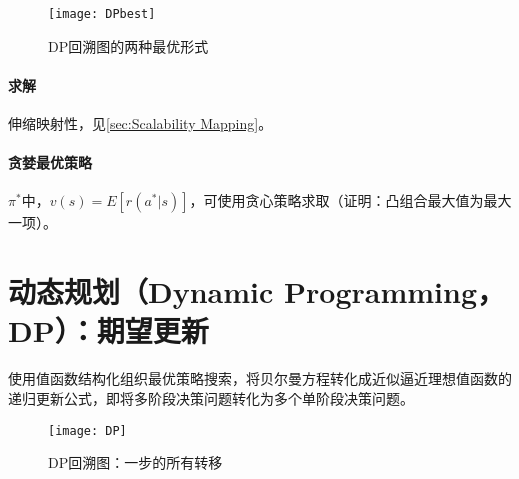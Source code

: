 \documentclass[
12pt, %
a4paper, 
oneside, %
headinclude,footinclude, %
]{scrartcl}
\begin{document}
\begin{figure}[H]
\centering 
\texttt{[image: DPbest]} 
\caption{DP回溯图的两种最优形式}
\end{figure}
\paragraph{求解}\label{sec:Scalability Mapping back}
伸缩映射性，见\ref{sec:Scalability Mapping}。
\paragraph{贪婪最优策略}
$ \pi^* $中，$ v(s) = E[r(a^*|s)] $，可使用贪心策略求取（证明：凸组合最大值为最大一项）。
\section[动态规划]{动态规划（Dynamic Programming，DP）：期望更新}
\noindent
\begin{minipage}{0.6\textwidth}
\hspace{2em}
使用值函数结构化组织最优策略搜索，将贝尔曼方程转化成近似逼近理想值函数的递归更新公式，即将多阶段决策问题转化为多个单阶段决策问题。
\end{minipage}
\begin{minipage}{0.4\textwidth}
\begin{figure}[H]
\centering 
\texttt{[image: DP]} 
\caption[DP回溯图]{DP回溯图：一步的所有转移}
\end{figure}
\end{minipage}
\end{document}

